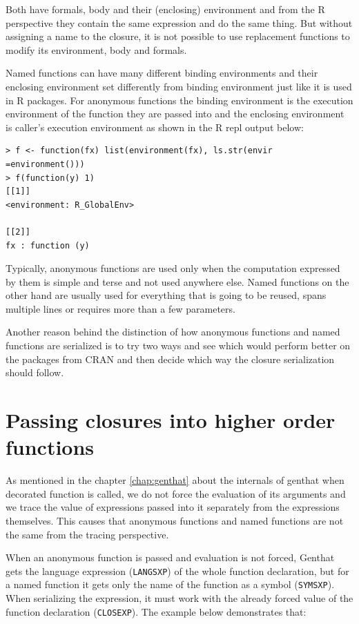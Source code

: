 \documentclass[thesis=B,english]{FITthesis}[2012/10/20]
\begin{document}
Both have formals, body and their (enclosing) environment and from the R perspective they contain the same expression and do the same thing. But without assigning a name to the closure, it is not possible to use replacement functions to modify its environment, body and formals. 

Named functions can have many different binding environments and their enclosing environment set differently from binding environment just like it is used in R packages. For anonymous functions the binding environment is the execution environment of the function they are passed into and the enclosing environment is caller’s execution environment as shown in the R repl output below:

\begin{verbatim}
> f <- function(fx) list(environment(fx), ls.str(envir =environment()))
> f(function(y) 1)
[[1]]
<environment: R_GlobalEnv>

[[2]]
fx : function (y)
\end{verbatim}

Typically, anonymous functions are used only when the computation expressed by them is simple and terse and not used anywhere else. Named functions on the other hand are usually used for everything that is going to be reused, spans multiple lines or requires more than a few parameters. 

Another reason behind the distinction of how anonymous functions and named functions are serialized is to try two ways and see which would perform better on the packages from CRAN and then decide which way the closure serialization should follow.

\section{Passing closures into higher order functions}
As mentioned in the chapter \ref{chap:genthat} about the internals of genthat when decorated function is called, we do not force the evaluation of its arguments and we trace the value of expressions passed into it separately from the expressions themselves. This causes that anonymous functions and named functions are not the same from the tracing perspective. 

When an anonymous function is passed and evaluation is not forced, Genthat gets the language expression (\verb|LANGSXP|) of the whole function declaration, but for a named function it gets only the name of the function as a symbol (\verb|SYMSXP|). When serializing the expression, it must work with the already forced value of the function declaration (\verb|CLOSEXP|). The example below demonstrates that:
\end{document}
